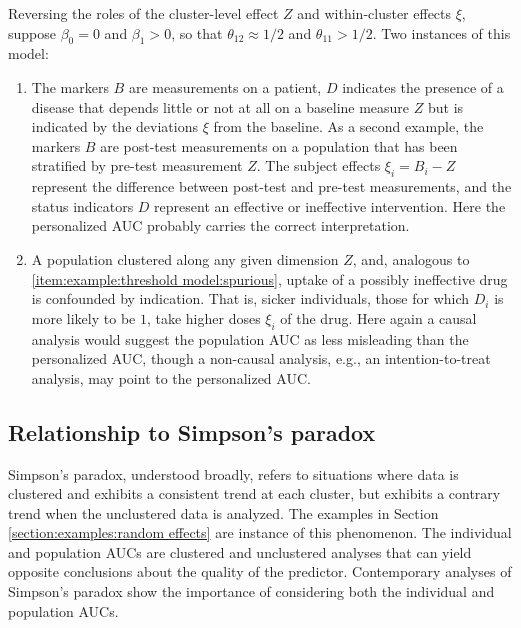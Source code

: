 \documentclass[12pt]{article}
\DeclareMathOperator{\AUC}{AUC}
\newcommand{\cind}{\perp \!\!\! \perp}
\newcommand{\aucindiv}{\theta_{11}}%
\newcommand{\aucpop}{\theta_{12}}%
\newcommand{\comment}[1]{
  \iftoggle{commenttoggle}{
    {\normalsize{\color{red}{ #1}}\normalsize}
  }
  {}
}
\begin{document}
Reversing the roles of the cluster-level effect $Z$ and within-cluster
effects $\xi$, suppose $\beta_0=0$ and $\beta_1>0$, so that $\aucpop\approx 1/2$ and
$\aucindiv>1/2$. Two instances of this model:
\begin{enumerate}[resume,label=(\alph*)]
\item  The markers $B$ are measurements on a patient,
$D$ indicates the presence of
a disease that depends little or not at all on a baseline measure $Z$ but is indicated by the deviations $\xi$ from the
baseline.  As a second example, the markers $B$ are post-test measurements on a population that has been stratified by pre-test measurement $Z$. The subject effects $\xi_i=B_i-Z$ represent the difference between post-test and pre-test measurements, and the status indicators $D$ represent an effective or ineffective intervention.
Here the personalized AUC probably carries the correct interpretation.
\item A population clustered along any given dimension $Z$, and, analogous to \ref{item:example:threshold model:spurious}, uptake of a possibly ineffective drug is confounded by indication. That is, sicker individuals, those for which $D_i$ is more likely to be $1$, take higher doses $\xi_i$ of the drug. Here again a causal analysis would suggest the population AUC as less misleading than the personalized AUC, though a non-causal analysis, e.g., an intention-to-treat analysis, may point to the personalized AUC.
\end{enumerate}

\subsection{Relationship to Simpson's paradox}
Simpson's paradox, understood broadly, refers to situations where data
is clustered and exhibits a consistent trend at each cluster, but
exhibits a contrary trend when the unclustered data is analyzed. The
examples in Section \ref{section:examples:random effects} are instance of this
phenomenon. The individual and population AUCs are clustered and
unclustered analyses that can yield opposite conclusions about the quality
of the predictor. Contemporary analyses of Simpson's paradox show the importance of considering both the individual and population AUCs.
\end{document}
